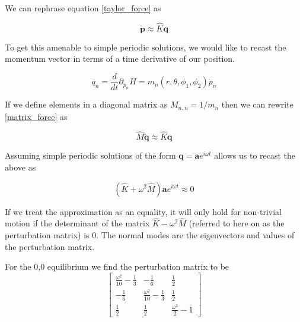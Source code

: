 \documentclass[prbg,preprint]{revtex4-1}
\begin{document}
We can rephrase equation \ref{taylor_force} as 

\begin{equation} \label{matrix_force}
	\boldsymbol{ \dot{ p }} \approx \widehat K \boldsymbol q
\end{equation}

To get this amenable to simple periodic solutions, we would like to recast the momentum vector in terms of a time derivative of our position.

\begin{equation}
	\ddot{ q_n } =\frac{d}{dt} \partial_{p_n} H = m_n(r,\theta,\phi_1, \phi_2) \dot p_n
\end{equation}

If we define elements in a diagonal matrix as 
$M_{n,n}=1/m_n$
then we can rewrite \ref{matrix_force} as 

\begin{equation}
	\widehat M \boldsymbol{ \ddot{ q }} \approx \widehat K \boldsymbol q
\end{equation}

Assuming simple periodic solutions of the form $\boldsymbol q = \boldsymbol a e^{i\omega t}$ allows us to recast the above as

\begin{equation}
	( 
	\widehat K + \omega^2 \widehat M
	)  \boldsymbol{ a}e^{i\omega t} \approx 0
\end{equation}

If we treat the approximation as an equality, it will only hold for non-trivial motion if the determinant of the matrix $\widehat K - \omega^2 \widehat M$ (referred to here on as the perturbation matrix) is 0. The normal modes are the eigenvectors and values of the perturbation matrix.

For the 0,0 equilibrium we find the perturbation matrix to be
\begin{equation}
	\left[\begin{matrix}\frac{\omega^{2}}{10} - \frac{1}{3} & - \frac{1}{6} & \frac{1}{2}\\
	- \frac{1}{6} & \frac{\omega^{2}}{10} - \frac{1}{3} & \frac{1}{2}\\
	\frac{1}{2} & \frac{1}{2} & \frac{\omega^{2}}{2} - 1\end{matrix}\right]
\end{equation}
\end{document}
